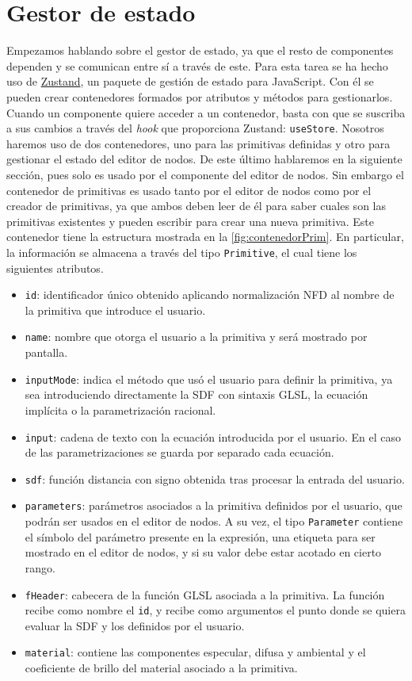 \section{Gestor de estado}
Empezamos hablando sobre el gestor de estado, ya que el resto de componentes dependen y se comunican entre sí a través de este. Para esta tarea se ha hecho uso de \href{https://github.com/pmndrs/zustand}{Zustand}, un paquete de gestión de estado para JavaScript. Con él se pueden crear contenedores formados por atributos y métodos para gestionarlos. Cuando un componente quiere acceder a un contenedor, basta con que se suscriba a sus cambios a través del \textit{hook} que proporciona Zustand: \texttt{useStore}. Nosotros haremos uso de dos contenedores, uno para las primitivas definidas y otro para gestionar el estado del editor de nodos. De este último hablaremos en la siguiente sección, pues solo es usado por el componente del editor de nodos. Sin embargo el contenedor de primitivas es usado tanto por el editor de nodos como por el creador de primitivas, ya que ambos deben leer de él para saber cuales son las primitivas existentes y pueden escribir para crear una nueva primitiva. Este contenedor tiene la estructura mostrada en la \autoref{fig:contenedorPrim}. En particular, la información se almacena a través del tipo \texttt{Primitive}, el cual tiene los siguientes atributos.
\begin{itemize}
    \item \texttt{id}: identificador único obtenido aplicando normalización NFD al nombre de la primitiva que introduce el usuario.
    \item \texttt{name}: nombre que otorga el usuario a la primitiva y será mostrado por pantalla.
    \item \texttt{inputMode}: indica el método que usó el usuario para definir la primitiva, ya sea introduciendo directamente la SDF con sintaxis GLSL, la ecuación implícita o la parametrización racional.
    \item \texttt{input}: cadena de texto con la ecuación introducida por el usuario. En el caso de las parametrizaciones se guarda por separado cada ecuación.
    \item \texttt{sdf}: función distancia con signo obtenida tras procesar la entrada del usuario.
    \item \texttt{parameters}: parámetros asociados a la primitiva definidos por el usuario, que podrán ser usados en el editor de nodos. A su vez, el tipo \texttt{Parameter} contiene el símbolo del parámetro presente en la expresión, una etiqueta para ser mostrado en el editor de nodos, y si su valor debe estar acotado en cierto rango. 
    \item \texttt{fHeader}: cabecera de la función GLSL asociada a la primitiva. La función recibe como nombre el \texttt{id}, y recibe como argumentos el punto donde se quiera evaluar la SDF y los definidos por el usuario.
    \item \texttt{material}: contiene las componentes especular, difusa y ambiental y el coeficiente de brillo del material asociado a la primitiva.
\end{itemize}
